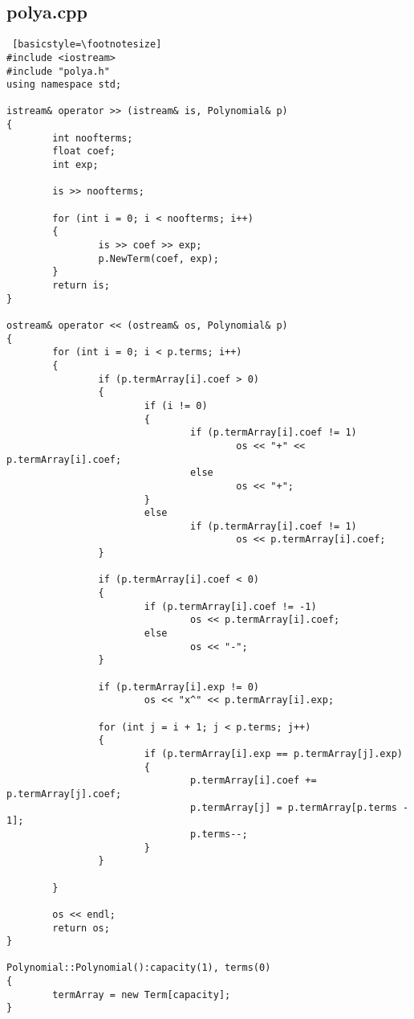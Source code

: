 \documentclass[twoside,twocolumn]{article}
\begin{document}
\newpage

\subsection{polya.cpp}
\begin{lstlisting} [basicstyle=\footnotesize]
#include <iostream>
#include "polya.h"
using namespace std;

istream& operator >> (istream& is, Polynomial& p)
{
        int noofterms;
        float coef;
        int exp;

        is >> noofterms;

        for (int i = 0; i < noofterms; i++)
        {
                is >> coef >> exp;
                p.NewTerm(coef, exp);
        }
        return is;
}

ostream& operator << (ostream& os, Polynomial& p)
{
        for (int i = 0; i < p.terms; i++)
        {
                if (p.termArray[i].coef > 0)
                {
                        if (i != 0)
                        {
                                if (p.termArray[i].coef != 1)
                                        os << "+" << p.termArray[i].coef;
                                else
                                        os << "+";
                        }
                        else
                                if (p.termArray[i].coef != 1)
                                        os << p.termArray[i].coef;
                }

                if (p.termArray[i].coef < 0)
                {
                        if (p.termArray[i].coef != -1)
                                os << p.termArray[i].coef;
                        else
                                os << "-";
                }

                if (p.termArray[i].exp != 0)
                        os << "x^" << p.termArray[i].exp;

                for (int j = i + 1; j < p.terms; j++)
                {
                        if (p.termArray[i].exp == p.termArray[j].exp)
                        {
                                p.termArray[i].coef += p.termArray[j].coef;
                                p.termArray[j] = p.termArray[p.terms - 1];
                                p.terms--;
                        }
                }

        }

        os << endl;
        return os;
}

Polynomial::Polynomial():capacity(1), terms(0)
{
        termArray = new Term[capacity];
}


\end{lstlisting}
\end{document}

